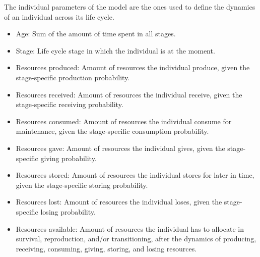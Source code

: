 \documentclass{article}
\begin{document}
The individual parameters of the model are the ones used to define the dynamics of an individual across its life cycle.

\begin{itemize}
    \item Age: Sum of the amount of time spent in all stages.
    \item Stage: Life cycle stage in which the individual is at the moment.
    \item Resources produced: Amount of resources the individual produce, given the stage-specific production probability.
    \item Resources received: Amount of resources the individual receive, given the stage-specific receiving probability.
    \item Resources consumed: Amount of resources the individual consume for maintenance, given the stage-specific consumption probability.
    \item Resources gave: Amount of resources the individual gives, given the stage-specific giving probability.
    \item Resources stored: Amount of resources the individual stores for later in time, given the stage-specific storing probability.
    \item Resources lost: Amount of resources the individual loses, given the stage-specific losing probability.
    \item Resources available: Amount of resources the individual has to allocate in survival, reproduction, and/or transitioning, after the dynamics of producing, receiving, consuming, giving, storing, and losing resources.
\end{itemize}
\end{document}
